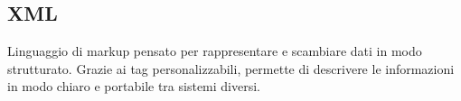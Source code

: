 \documentclass[a4paper,12pt]{article}
\begin{document}
\newpage
      
        \section{}
        
          \subsection*{XML}
			Linguaggio di markup pensato per rappresentare e scambiare dati in modo strutturato. Grazie ai tag personalizzabili, permette di descrivere le informazioni in modo chiaro e portabile tra sistemi diversi.
        
\newpage
        \section{}
        
        
\newpage
        \section{}
        
\end{document}
